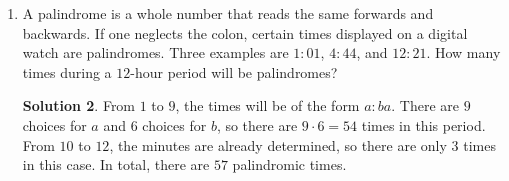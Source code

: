 \documentclass{article}
\theoremstyle{definition}
\newtheorem*{solution}{Solution}
\begin{document}
\begin{multicols*}{2}
\begin{enumerate}
\begin{center}
            \end{center}
            \begin{solution}
                The area of the shaded region is equal to the area of the quarter circle  he area of the rectangle taken away.
                The area of the rectangle is $4 \cdot 3 = 12$, so we just need the quarter circle.
                Applying the Pythagorean Theorem to $\triangle ADC$, we have $(AC)^2 = 4^2 + 3^2 \rightarrow AC = 5$.
                Since $ABCD$ is a rectangle, $BD = AC = 5$.
                Clearly $BD$ is a radius of the circle, so the area of the whole circle is $\pi 5^2 = 25\pi$ and the area of the quarter circle is $\frac {25\pi}{4}$, which is between $7$ and $8$.
            \end{solution}
        \item A palindrome is a whole number that reads the same forwards and backwards.
            If one neglects the colon, certain times displayed on a digital watch are palindromes.
            Three examples are $1\colon 01$, $4\colon 44$, and $12\colon 21$.
            How many times during a $12$-hour period will be palindromes?
            \begin{solution}
                From $1$ to $9$, the times will be of the form $a\colon ba$.
                There are $9$ choices for $a$ and $6$ choices for $b$, so there are $9 \cdot 6 = 54$ times in this period.
                From $10$ to $12$, the minutes are already determined, so there are only $3$ times in this case.
                In total, there are $57$ palindromic times.
            \end{solution}
    \end{enumerate}
\end{multicols*}
\end{document}
